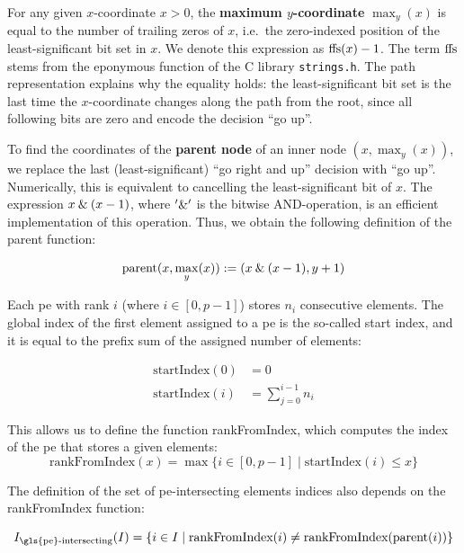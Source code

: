 For any given $x$-coordinate $x > 0$, the \textbf{maximum $y$-coordinate} $\max_y(x)$ is equal to the number of trailing zeros of $x$, i.e.\ the zero-indexed position of the least-significant bit set in $x$.
We denote this expression as $\textrm{ffs} (x) - 1$.
The term $\textrm{ffs}$ stems from the eponymous function of the C library \texttt{strings.h}.
The path representation explains why the equality holds: the least-significant bit set is the last time the $x$-coordinate changes along the path from the root, since all following bits are zero and encode the decision \enquote{go up}.

To find the coordinates of the \textbf{parent node} of an inner node $(x, \max_y(x))$, we replace the last (least-significant) \enquote{go right and up} decision with \enquote{go up}. 
Numerically, this is equivalent to cancelling the least-significant bit of $x$.
The expression $x \mathbin{\&} (x - 1)$, where $'\mathbin{\&}'$ is the bitwise AND-operation, is an efficient implementation of this operation.
Thus, we obtain the following definition of the parent function:

\begin{equation}
\label{eq:parent}
\textrm{parent} (x, \max_y (x) ) := (x \mathbin{\&} (x - 1), y + 1)
\end{equation}

Each \gls{pe} with rank $i$ (where $i \in [0, p - 1]$) stores $n_i$ consecutive elements.
The global index of the first element assigned to a \gls{pe} is the so-called start index, and it is equal to the prefix sum of the assigned number of elements:

\begin{align}
\textrm{startIndex} (0) &= 0 \\
\textrm{startIndex} (i) &= \sum_{j = 0}^{i - 1} n_i
\label{eq:startIndex}
\end{align}

This allows us to define the function rankFromIndex, which computes the index of the \gls{pe} that stores a given elements:
\begin{equation}
\textrm{rankFromIndex} (x) = \max \{i \in [0, p - 1] \;|\; \textrm{startIndex} (i) \leq x \}
\end{equation}

The definition of the set of \gls{pe}-intersecting elements indices also depends on the rankFromIndex function:

\newcommand{\rankIntersectingIndices}{I_{\textrm{\gls{pe}-intersecting}}}
\begin{equation}
\rankIntersectingIndices (I) = \{i \in I \;|\; \textrm{rankFromIndex} (i) \neq \textrm{rankFromIndex} (\textrm{parent} (i)) \}
\end{equation}

